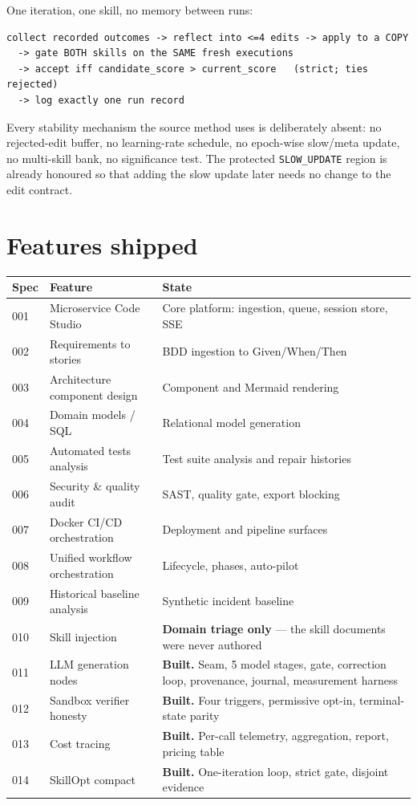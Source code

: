 \documentclass[11pt,a4paper]{article}
\begin{document}
One iteration, one skill, no memory between runs:

\begin{lstlisting}
collect recorded outcomes -> reflect into <=4 edits -> apply to a COPY
  -> gate BOTH skills on the SAME fresh executions
  -> accept iff candidate_score > current_score   (strict; ties rejected)
  -> log exactly one run record
\end{lstlisting}

Every stability mechanism the source method uses is deliberately absent: no
rejected-edit buffer, no learning-rate schedule, no epoch-wise slow/meta update, no
multi-skill bank, no significance test. The protected
\texttt{SLOW\_UPDATE} region is already honoured so that adding the slow update later
needs no change to the edit contract.

\section{Features shipped}

\begin{longtable}{@{}p{}p{}p{}@{}}
\toprule
\textbf{Spec} & \textbf{Feature} & \textbf{State} \\
\midrule
\endhead
001 & Microservice Code Studio & Core platform: ingestion, queue, session store, SSE \\
002 & Requirements to stories & BDD ingestion to Given/When/Then \\
003 & Architecture component design & Component and Mermaid rendering \\
004 & Domain models / SQL & Relational model generation \\
005 & Automated tests analysis & Test suite analysis and repair histories \\
006 & Security \& quality audit & SAST, quality gate, export blocking \\
007 & Docker CI/CD orchestration & Deployment and pipeline surfaces \\
008 & Unified workflow orchestration & Lifecycle, phases, auto-pilot \\
009 & Historical baseline analysis & Synthetic incident baseline \\
010 & Skill injection & \textbf{Domain triage only} --- the skill documents were never authored \\
011 & LLM generation nodes & \textbf{Built.} Seam, 5 model stages, gate, correction loop, provenance, journal, measurement harness \\
012 & Sandbox verifier honesty & \textbf{Built.} Four triggers, permissive opt-in, terminal-state parity \\
013 & Cost tracing & \textbf{Built.} Per-call telemetry, aggregation, report, pricing table \\
014 & SkillOpt compact & \textbf{Built.} One-iteration loop, strict gate, disjoint evidence \\
\bottomrule
\end{longtable}
\end{document}
